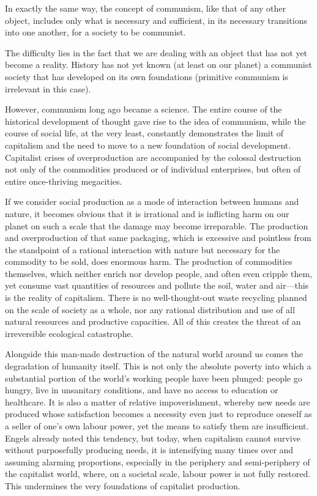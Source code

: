 \documentclass[../main]{subfiles}
\begin{document}
In exactly the same way, the concept of communism, like that of any other object, includes only what is necessary and sufficient, in its necessary transitions into one another, for a society to be communist.

The difficulty lies in the fact that we are dealing with an object that has not yet become a reality. History has not yet known (at least on our planet) a communist society that has developed on its own foundations (primitive communism is irrelevant in this case).

However, communism long ago became a science. The entire course of the historical development of thought gave rise to the idea of communism, while the course of social life, at the very least, constantly demonstrates the limit of capitalism and the need to move to a new foundation of social development. Capitalist crises of overproduction are accompanied by the colossal destruction not only of the commodities produced or of individual enterprises, but often of entire once-thriving megacities.

If we consider social production as a mode of interaction between humans and nature, it becomes obvious that it is irrational and is inflicting harm on our planet on such a scale that the damage may become irreparable. The production and overproduction of that same packaging, which is excessive and pointless from the standpoint of a rational interaction with nature but necessary for the commodity to be sold, does enormous harm. The production of commodities themselves, which neither enrich nor develop people, and often even cripple them, yet consume vast quantities of resources and pollute the soil, water and air—this is the reality of capitalism. There is no well-thought-out waste recycling planned on the scale of society as a whole, nor any rational distribution and use of all natural resources and productive capacities. All of this creates the threat of an irreversible ecological catastrophe.

Alongside this man-made destruction of the natural world around us comes the degradation of humanity itself. This is not only the absolute poverty into which a substantial portion of the world's working people have been plunged: people go hungry, live in unsanitary conditions, and have no access to education or healthcare. It is also a matter of relative impoverishment, whereby new needs are produced whose satisfaction becomes a necessity even just to reproduce oneself as a seller of one's own labour power, yet the means to satisfy them are insufficient. Engels already noted this tendency, but today, when capitalism cannot survive without purposefully producing needs, it is intensifying many times over and assuming alarming proportions, especially in the periphery and semi-periphery of the capitalist world, where, on a societal scale, labour power is not fully restored. This undermines the very foundations of capitalist production.
\end{document}
